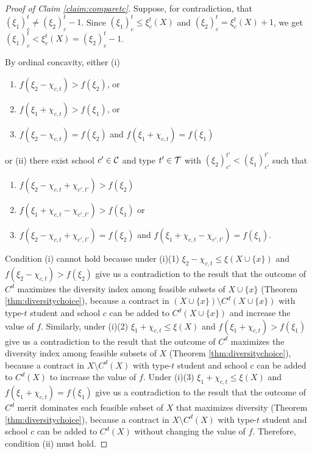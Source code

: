 \documentclass[12pt]{amsart}
\theoremstyle{remark}
\begin{document}
\begin{proof}[Proof of Claim \ref{claim:comparetc}]\renewcommand{\qedsymbol}{$\blacksquare$}
Suppose, for contradiction, that $(\xi_1)^t_c\neq (\xi_2)^t_c-1$. Since $(\xi_1)^t_c\leq \xi^t_c(X)$ and
$(\xi_2)^t_c = \xi^t_c(X)+1$, we get $(\xi_1)^t_c < \xi^t_c(X)=(\xi_2)^t_c-1$.

By ordinal concavity,
either (i)
\begin{enumerate}
\item $f(\xi_2-\chi_{c,t})>f(\xi_2)$, or
\item $f(\xi_1+\chi_{c,t})>f(\xi_1)$, or
\item $f(\xi_2-\chi_{c,t})=f(\xi_2)$ and $f(\xi_1+\chi_{c,t}) = f(\xi_1)$
\end{enumerate}
or (ii) there exist school $c'\in \mathcal{C}$ and type $t'\in \mathcal{T}$ with $(\xi_2)_{c'}^{t'}<(\xi_1)_{c'}^{t'}$ such that
\begin{enumerate}
\item $f(\xi_2-\chi_{c,t}+\chi_{c',t'})>f(\xi_2)$
\item $f(\xi_1+\chi_{c,t}-\chi_{c',t'})>f(\xi_1)$ or
\item $f(\xi_2-\chi_{c,t}+\chi_{c',t'})=f(\xi_2)$ and $f(\xi_1+\chi_{c,t}-\chi_{c',t'}) = f(\xi_1)$.
\end{enumerate}
Condition (i) cannot hold because under (i)(1) $\xi_2-\chi_{c,t} \leq \xi(X\cup \{x\})$
and $f(\xi_2-\chi_{c,t})>f(\xi_2)$ give us a contradiction to the result that the outcome of $C^d$
maximizes the diversity index among feasible subsets of $X\cup \{x\}$ (Theorem \ref{thm:diversitychoice}),
because a contract in $(X\cup \{x\}) \setminus C^d(X\cup \{x\})$ with type-$t$ student and
school $c$ can be added to $C^d(X\cup \{x\})$ and increase the value of $f$.
Similarly, under (i)(2) $\xi_1+\chi_{c,t} \leq \xi(X)$ and $f(\xi_1+\chi_{c,t})>f(\xi_1)$
give us a contradiction to the result that the outcome of $C^d$ maximizes the diversity index among feasible subsets of $X$
(Theorem \ref{thm:diversitychoice}), because a contract in $X\setminus C^d(X)$ with type-$t$ student and
school $c$ can be added to $C^d(X)$ to increase the value of $f$. Under (i)(3) $\xi_1+\chi_{c,t} \leq \xi(X)$ and
$f(\xi_1+\chi_{c,t}) = f(\xi_1)$ give us a contradiction to the result that the outcome of $C^d$ merit dominates each feasible
subset of $X$ that maximizes diversity (Theorem \ref{thm:diversitychoice}), because a contract in
$X\setminus C^d(X)$ with type-$t$ student and school $c$ can be added to $C^d(X)$ without changing the value of $f$.
Therefore, condition (ii) must hold.


\end{proof}
\end{document}
